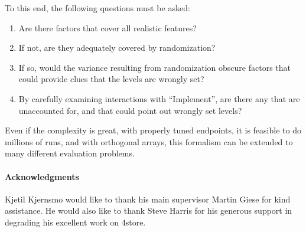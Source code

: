 \documentclass{llncs}
\begin{document}
To this end, the following questions must be asked:
\begin{enumerate}
\item Are there factors that cover all realistic features?
\item If not, are they adequately covered by randomization?
\item If so, would the variance resulting from randomization obscure
  factors that could provide clues that the levels are wrongly set?
\item By carefully examining interactions with ``Implement'', are
  there any that are unaccounted for, and that could point out wrongly
  set levels?
\end{enumerate}

Even if the complexity is great, with properly tuned endpoints, it is
feasible to do millions of runs, and with orthogonal arrays, this
formalism can be extended to many different evaluation problems.



\paragraph*{Acknowledgments}

Kjetil Kjernsmo would like to thank his main supervisor Martin Giese
for kind assistance. He would also like to thank Steve Harris for his
generous support in degrading his excellent work on 4store.


%
%
%


\end{document}
